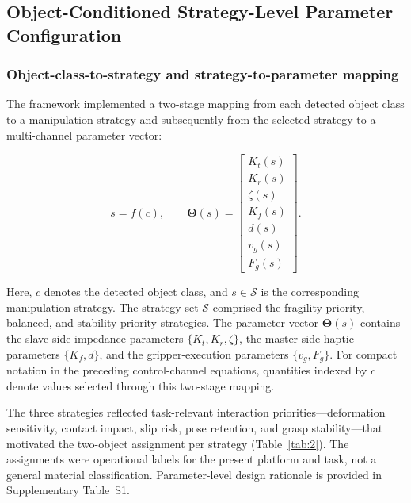 \subsection{Object-Conditioned Strategy-Level Parameter Configuration}
\subsubsection{Object-class-to-strategy and strategy-to-parameter mapping}
The framework implemented a two-stage mapping from each detected object class to a manipulation strategy and subsequently from the selected strategy to a multi-channel parameter vector:

\begin{equation}
\label{eq:strategy-vector}
s=f(c),\qquad
\boldsymbol{\Theta}(s)=
\begin{bmatrix}
K_t(s) \\ K_r(s) \\ \zeta(s) \\ K_f(s) \\ d(s) \\ v_g(s) \\ F_g(s)
\end{bmatrix}.
\end{equation}

Here, $c$ denotes the detected object class, and $s\in\mathcal{S}$ is the corresponding manipulation strategy. The strategy set $\mathcal{S}$ comprised the fragility-priority, balanced, and stability-priority strategies. The parameter vector $\boldsymbol{\Theta}(s)$ contains the slave-side impedance parameters $\{K_t,K_r,\zeta\}$, the master-side haptic parameters $\{K_f,d\}$, and the gripper-execution parameters $\{v_g,F_g\}$. For compact notation in the preceding control-channel equations, quantities indexed by $c$ denote values selected through this two-stage mapping.

The three strategies reflected task-relevant interaction priorities---deformation sensitivity, contact impact, slip risk, pose retention, and grasp stability---that motivated the two-object assignment per strategy (Table~\ref{tab:2}). The assignments were operational labels for the present platform and task, not a general material classification. Parameter-level design rationale is provided in Supplementary Table~S1.

